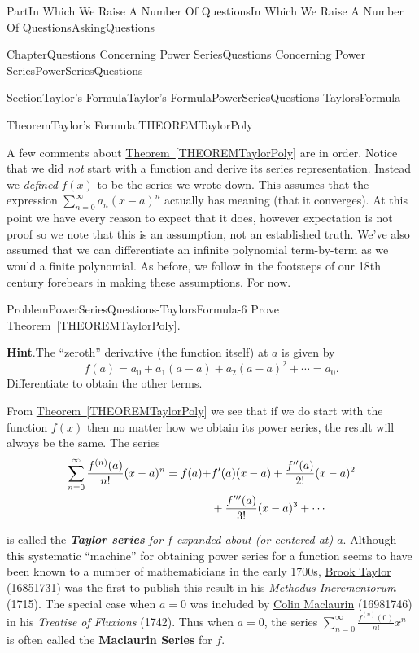 \documentclass[oneside,10pt,]{book}
\newcommand{\blocktitlefont}{\relax}
\newcommand{\xreffont}{\relax}
\newcommand{\alert}[1]{\textbf{\textit{#1}}}
\newcommand{\terminology}[1]{\textbf{#1}}
\numberwithin{equation}{part}
\newcommand{\amp}{&}
\begin{document}
\begin{partptx}{Part}{In Which We Raise A Number Of Questions}{}{In Which We Raise A Number Of Questions}{}{}{AskingQuestions}
\begin{chapterptx}{Chapter}{Questions Concerning Power Series}{}{Questions Concerning Power Series}{}{}{PowerSeriesQuestions}
\begin{sectionptx}{Section}{Taylor's Formula}{}{Taylor's Formula}{}{}{PowerSeriesQuestions-TaylorsFormula}
\begin{theorem}{Theorem}{Taylor's Formula.}{}{THEOREMTaylorPoly}
\end{theorem}
A few comments about \hyperref[THEOREMTaylorPoly]{Theorem~{\xreffont\ref{THEOREMTaylorPoly}}} are in order.  Notice that we did \emph{not} start with a function and derive its series representation.  Instead we \emph{defined} \(f(x)\) to be the series we wrote down.  This assumes that the expression \(\sum_{n=0}^\infty a_n(x-a)^n\) actually has meaning (that it converges).  At this point we have every reason to expect that it does, however expectation is not proof so we note that this is an assumption, not an established truth.  We've also assumed that we can differentiate an infinite polynomial term-by-term as we would a finite polynomial.  As before, we follow in the footsteps of our 18th century forebears in making these assumptions.  For now.%
\begin{problem}{Problem}{}{PowerSeriesQuestions-TaylorsFormula-6}%
Prove \hyperref[THEOREMTaylorPoly]{Theorem~{\xreffont\ref{THEOREMTaylorPoly}}}.%
\par\smallskip%
\noindent\textbf{\blocktitlefont Hint}.\hypertarget{PowerSeriesQuestions-TaylorsFormula-6-3}{}\quad{}The ``zeroth'' derivative (the function itself) at \(a\) is given by%
\begin{equation*}
f(a)=a_0+a_1(a-a)+a_2(a-a)^2+\cdots=a_0\text{.}
\end{equation*}
Differentiate to obtain the other terms.%
\end{problem}
From \hyperref[THEOREMTaylorPoly]{Theorem~{\xreffont\ref{THEOREMTaylorPoly}}} we see that if we do start with the function \(f(x)\) then no matter how we obtain its power series, the result will always be the same.  The series%
\begin{align}
\sum_{n=0}^\infty\frac{f^{(n)}(a)}{n!}(x-a)^n=f(a)+\amp{}f^\prime(a)(x-a)+\frac{f^{\prime\prime}(a)}{2!}(x-a)^2\notag\\
\amp{}+\frac{f^{\prime\prime\prime}(a)}{3!}(x-a)^3+\cdots\label{TaylorsSeries}
\end{align}
%
\par
is called the \emph{\alert{Taylor series} for \(f\) expanded about (or centered at) \(a\)}.  Although this systematic ``machine'' for obtaining power series for a function seems to have been known to a number of mathematicians in the early 1700s, \href{https://mathshistory.st-andrews.ac.uk/Biographies/Taylor/}{Brook Taylor} (1685\textendash{}1731) was the first to publish this result in his \textit{Methodus Incrementorum} (1715). The special case when \(a=0\) was included by \href{https://mathshistory.st-andrews.ac.uk/Biographies/Maclaurin/}{Colin Maclaurin} (1698\textendash{}1746) in his \emph{Treatise of Fluxions} (1742). Thus when \(a=0\), the series \(\sum_{n=0}^\infty\frac{f^{(n)}(0)}{n!}x^n\) is often called the \terminology{Maclaurin Series} for \(f\).%

\end{sectionptx}
\end{chapterptx}
\end{partptx}
\end{document}
